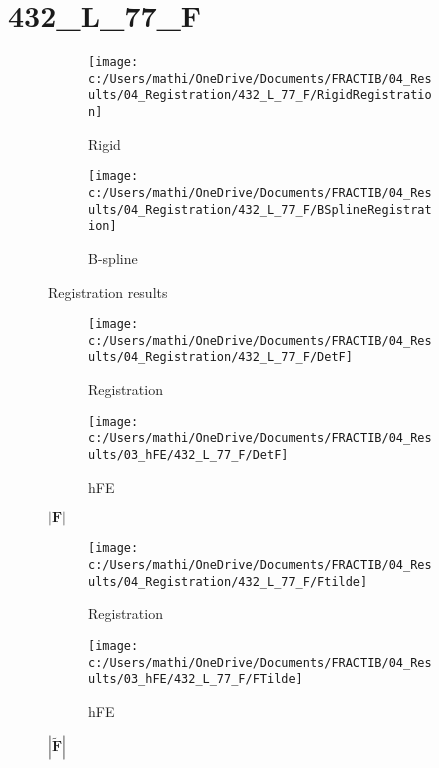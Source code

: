 \documentclass{article}%
\begin{document}
%
\normalsize%
\section*{432\_L\_77\_F}%
\label{sec:432L77F}%


\begin{figure}[h!]%
\begin{subfigure}[b]{0.5\linewidth}%
\texttt{[image: c:/Users/mathi/OneDrive/Documents/FRACTIB/04\_Results/04\_Registration/432\_L\_77\_F/RigidRegistration]}%
\caption{Rigid}%
\end{subfigure}%
\begin{subfigure}[b]{0.5\linewidth}%
\texttt{[image: c:/Users/mathi/OneDrive/Documents/FRACTIB/04\_Results/04\_Registration/432\_L\_77\_F/BSplineRegistration]}%
\caption{B{-}spline}%
\end{subfigure}%
\caption{Registration results}%
\end{figure}

%


\begin{figure}[h!]%
\begin{subfigure}[b]{0.5\linewidth}%
\texttt{[image: c:/Users/mathi/OneDrive/Documents/FRACTIB/04\_Results/04\_Registration/432\_L\_77\_F/DetF]}%
\caption{Registration}%
\end{subfigure}%
\begin{subfigure}[b]{0.5\linewidth}%
\texttt{[image: c:/Users/mathi/OneDrive/Documents/FRACTIB/04\_Results/03\_hFE/432\_L\_77\_F/DetF]}%
\caption{hFE}%
\end{subfigure}%
\caption{$|\mathbf{F}|$}%
\end{figure}

%


\begin{figure}[h!]%
\begin{subfigure}[b]{0.5\linewidth}%
\texttt{[image: c:/Users/mathi/OneDrive/Documents/FRACTIB/04\_Results/04\_Registration/432\_L\_77\_F/Ftilde]}%
\caption{Registration}%
\end{subfigure}%
\begin{subfigure}[b]{0.5\linewidth}%
\texttt{[image: c:/Users/mathi/OneDrive/Documents/FRACTIB/04\_Results/03\_hFE/432\_L\_77\_F/FTilde]}%
\caption{hFE}%
\end{subfigure}%
\caption{$|\widetilde{\mathbf{F}}|$}%
\end{figure}

%
\newpage%
\end{document}
